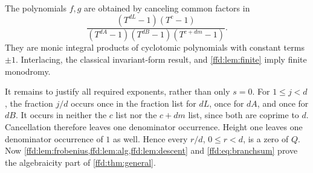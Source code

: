 \documentclass[11pt]{article}
\theoremstyle{definition}
\theoremstyle{remark}
\begin{document}
The polynomials $f,g$ are obtained by canceling common factors in
\[
 \frac{(T^{dL}-1)(T^c-1)}
 {(T^{dA}-1)(T^{dB}-1)(T^{c+dm}-1)}.
\]
They are monic integral products of cyclotomic polynomials with constant
terms $\pm1$. Interlacing, the classical invariant-form result, and
\cref{ffd:lem:finite} imply finite monodromy.

It remains to justify all required exponents, rather than only $s=0$.
For $1\le j<d$, the fraction $j/d$ occurs once in the fraction list for
$dL$, once for $dA$, and once for $dB$. It occurs in neither the $c$ list
nor the $c+dm$ list, since both are coprime to $d$. Cancellation therefore
leaves one denominator occurrence. Height one leaves one denominator
occurrence of $1$ as well. Hence every $r/d$, $0\le r<d$, is a zero of $Q$.
Now \cref{ffd:lem:frobenius,ffd:lem:alg,ffd:lem:descent} and \eqref{ffd:eq:branchsum} prove
the algebraicity part of \cref{ffd:thm:general}.
\end{document}

